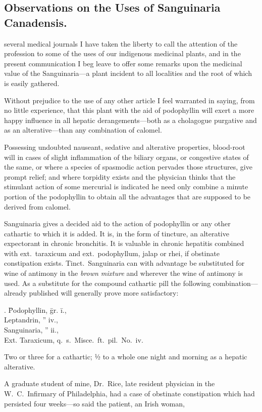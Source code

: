 \subsection*{Observations on the Uses of Sanguinaria
Canadensis.}



 several medical journals I have taken the liberty to call the attention
of the profession to some of the uses of our indigenous medicinal
plants, and in the present communication I beg leave to offer some
remarks upon the medicinal value of the Sanguinaria---a plant incident
to all localities and the root of which is easily gathered.

Without prejudice to the use of any other article I feel warranted in
saying, from no little experience, that this plant with the aid of podophyllin
will exert a more happy influence in all hepatic derangements---both
as a cholagogue purgative and as an alterative---than any combination
of calomel.

Possessing undoubted nauseant, sedative and alterative properties,
blood-root will in cases of slight inflammation of the biliary organs, or
congestive states of the same, or where a species of spasmodic action
pervades those structures, give prompt relief; and where torpidity
exists and the physician thinks that the stimulant action of some mercurial
is indicated he need only combine a minute portion of the
podophyllin to obtain all the advantages that are supposed to be
derived from calomel.

Sanguinaria gives a decided aid to the action of podophyllin or any
other cathartic to which it is added.   It is, in the form of tincture, an
alterative expectorant in chronic bronchitis.   It is valuable in chronic
hepatitis combined with ext.\ taraxicum and ext.\ podophyllum, jalap or
rhei, if obstinate constipation exists.    Tinct.\ Sanguinaria can with
advantage be substituted for wine of antimony in the \emph{brown mixture}
and wherever the wine of antimony is used.   As a substitute for the
compound cathartic pill the following combination---already published
will generally prove more satisfactory:

\begin{center}
\begin{tabbing}
  \prescription. \= Podophyllin, \= gr. \= i., \\
    \> Leptandrin, \> ''\> iv., \\
    \> Sanguinaria, \> ''\> ii., \\
    \> Ext. Taraxicum, q.\ s.\ Misce.\ ft.\ pil.\ No.\ iv. \\
\end{tabbing}
\end{center}
Two or three for a cathartic; ½ to a whole one night and morning as a
hepatic alterative.

A graduate student of mine, Dr.~Rice, late resident physician in the
W.~C.\ Infirmary of Philadelphia, had a case of obstinate constipation
which had persisted four weeks---so said the patient, an Irish woman,\endinput